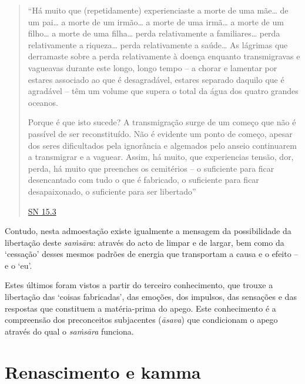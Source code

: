 \begin{quote}

  ``Há muito que (repetidamente) experienciaste a morte de uma mãe\ldots{} de um
  pai\ldots{} a morte de um irmão\ldots{} a morte de uma irmã\ldots{} a morte de
  um filho\ldots{} a morte de uma filha\ldots{} perda relativamente a
  familiares\ldots{} perda relativamente a riqueza\ldots{} perda relativamente a
  saúde\ldots{} As lágrimas que derramaste sobre a perda relativamente à doença
  enquanto transmigravas e vagueavas durante este longo, longo tempo -- a chorar
  e lamentar por estares associado ao que é desagradável, estares separado
  daquilo que é agradável -- têm um volume que supera o total da água dos quatro
  grandes oceanos.

  Porque é que isto sucede? A transmigração surge de um começo que não é
  passível de ser reconstituído. Não é evidente um ponto de começo, apesar dos
  seres dificultados pela ignorância e algemados pelo anseio continuarem a
  transmigrar e a vaguear. Assim, há muito, que experiencias tensão, dor, perda,
  há muito que preenches os cemitérios -- o suficiente para ficar desencantado
  com tudo o que é fabricado, o suficiente para ficar desapaixonado, o
  suficiente para ser libertado''

  \href{https://suttacentral.net/sn15.3/en/thanissaro}{SN 15.3}

\end{quote}

Contudo, nesta admoestação existe igualmente a mensagem da possibilidade da
libertação deste \emph{saṁsāra}: através do acto de limpar e de largar, bem como
da `cessação' desses mesmos padrões de energia que transportam a causa e o
efeito -- e o `eu'.

Estes últimos foram vistos a partir do terceiro conhecimento, que trouxe a
libertação das `coisas fabricadas', das emoções, dos impulsos, das sensações e
das respostas que constituem a matéria-prima do apego. Este conhecimento é a
compreensão dos preconceitos subjacentes (\emph{āsava}) que condicionam o apego
através do qual o \emph{saṁsāra} funciona.

\section{Renascimento e kamma}

